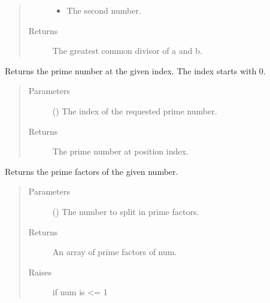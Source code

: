 \documentclass[letterpaper,10pt,english]{sphinxhowto}
\begin{document}
\begin{fulllineitems}
\begin{fulllineitems}
\begin{quote}
\begin{description}
\begin{itemize}
\item {} 
 \textendash{} The second number.

\end{itemize}

\item[{Returns}] \leavevmode
The greatest common divisor of a and b.

\end{description}\end{quote}

\end{fulllineitems}


\begin{fulllineitems}
\label{\detokenize{prime:prime.Prime.get_prime}}
Returns the prime number at the given index. The index starts with 0.
\begin{quote}\begin{description}
\item[{Parameters}] \leavevmode
{} () \textendash{} The index of the requested prime number.

\item[{Returns}] \leavevmode
The prime number at position index.

\end{description}\end{quote}

\end{fulllineitems}


\begin{fulllineitems}
\label{\detokenize{prime:prime.Prime.get_prime_factors}}
Returns the prime factors of the given number.
\begin{quote}\begin{description}
\item[{Parameters}] \leavevmode
{} () \textendash{} The number to split in prime factors.

\item[{Returns}] \leavevmode
An array of prime factors of num.

\item[{Raises}] \leavevmode
{} \textendash{} if num is \textless{}= 1

\end{description}\end{quote}

\end{fulllineitems}


\end{fulllineitems}
\end{document}
